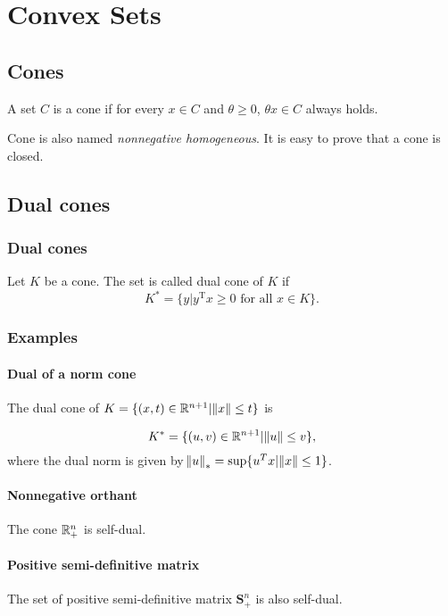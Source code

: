 \chapter{Convex Sets}
\section{Cones}
\begin{defn}
A set $C$ is a cone if for every $x \in C$ and $\theta \geq 0$, $\theta 
x \in C$ always holds.
\end{defn}
Cone is also named \emph{nonnegative homogeneous}. It is easy to prove 
that a cone is closed.
\section{Dual cones}
\subsection{Dual cones}
\begin{defn}
  Let $K$ be a cone. The set is called dual cone of $K$ if
  \begin{equation*}
    K^*=\{y|y^{\text{T}}x \geq 0 \text{ for all } x \in K\}.
  \end{equation*}
\end{defn}
\subsection{Examples}
\subsubsection{Dual of a norm cone}
The dual cone of $K=\{(x,t) \in \mathbb{R}^{n+1}|\norm{x} \le t\}$ is

\begin{equation*}
  K^*=\{(u,v) \in \mathbb{R}^{n+1}|\norm{u} \le v\},
\end{equation*}
where the dual norm is given by $\norm{u}_*=\sup\{u^Tx|\norm{x} \le 1\}$.

\subsubsection{Nonnegative orthant}
The cone $\mathbb{R}_+^n$ is self-dual.

\subsubsection{Positive semi-definitive matrix}
The set of positive semi-definitive matrix $\mathbf{S}_+^n$ is also 
self-dual.

